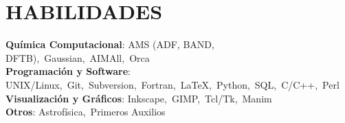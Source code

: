 \section{HABILIDADES}
\begin{itemize}[leftmargin=0in, label={}]
  \small{\item{
    \textbf{Química Computacional}\hspace{2pt}:\hspace{4pt}%
      AMS (ADF, BAND, DFTB),\ Gaussian,\ AIMAll,\ Orca
      \vspace{2pt}\\
    \textbf{Programación y Software}\hspace{2pt}:\hspace{4pt}%
      UNIX/Linux,\ Git,\ Subversion,\ Fortran,\ \LaTeX,\ Python,\ SQL,\ C/C++,\ Perl
      \vspace{2pt}\\
    \textbf{Visualización y Gráficos}\hspace{2pt}:\hspace{4pt}%
      Inkscape,\ GIMP,\ Tcl/Tk,\ Manim
      \vspace{2pt}\\
    \textbf{Otros}\hspace{2pt}:\hspace{4pt}%
      Astrofísica,\ Primeros Auxilios
  }}
\end{itemize}
